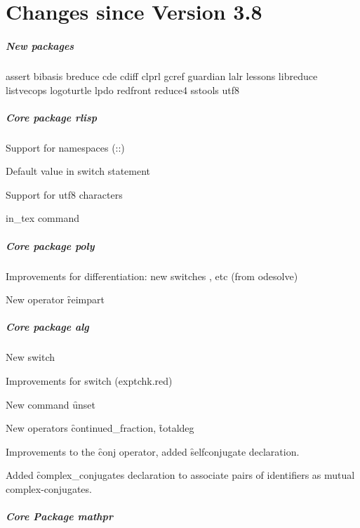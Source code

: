 \chapter{Changes since Version 3.8}

\paragraph*{New packages}

assert
bibasis
breduce
cde
cdiff
clprl
gcref
guardian
lalr
lessons
libreduce
listvecops
logoturtle
lpdo
redfront
reduce4
sstools
utf8

\paragraph*{Core package rlisp}

Support for namespaces (::)

Default value in switch statement

Support for utf8 characters

in\_tex command

\paragraph*{Core package poly}

Improvements for differentiation: new switches ,  etc
(from odesolve)

New operator \f{reimpart}

\paragraph*{Core package alg}

New switch 

Improvements for switch  (exptchk.red)

New command \f{unset}

New operators \f{continued\_fraction}, \f{totaldeg}

Improvements to the \f{conj} operator, added \f{selfconjugate} declaration.

Added \f{complex\_conjugates} declaration to associate pairs of identifiers
as mutual complex-conjugates.

\paragraph*{Core Package mathpr}

